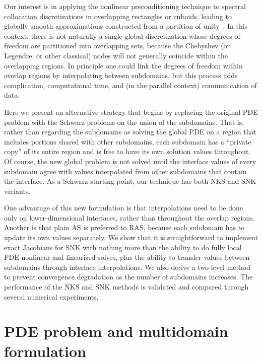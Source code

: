 Our interest is in applying the nonlinear preconditioning technique to spectral collocation discretizations in overlapping rectangles or cuboids, leading to globally smooth approximations constructed from a partition of unity~\cite{AitonTA}. In this context, there is not naturally a single global discretization whose degrees of freedom are partitioned into overlapping sets, because the Chebyshev (or Legendre, or other classical) nodes will not generally coincide within the overlapping regions. In principle one could link the degrees of freedom within overlap regions by interpolating between subdomains, but this process adds complication, computational time, and (in the parallel context) communication of data.

Here we present an alternative strategy that begins by replacing the original PDE problem with the Schwarz problems on the union of the subdomains. That is, rather than regarding the subdomains as solving the global PDE on a region that includes portions shared with other subdomains, each subdomain has a ``private copy'' of its entire region and is free to have its own solution values throughout. Of course, the new global problem is not solved until the interface values of every subdomain agree with values interpolated from other subdomains that contain the interface. As a Schwarz starting point, our technique has both NKS and SNK variants. 

One advantage of this new formulation is that interpolations need to be done only on lower-dimensional interfaces, rather than throughout the overlap regions. Another is that plain AS is preferred to RAS, because each subdomain has to update its own values separately. We show that it is straightforward to implement exact Jacobians for SNK with nothing more than the ability to do fully local PDE nonlinear and linearized solves, plus the ability to transfer values between subdomains through interface interpolations. We also derive a two-level method to prevent convergence degradation as the number of subdomains increases. The performance of the NKS and SNK methods is validated and compared through several numerical experiments. 


\section{PDE problem and multidomain formulation}
\label{sec:pde}

